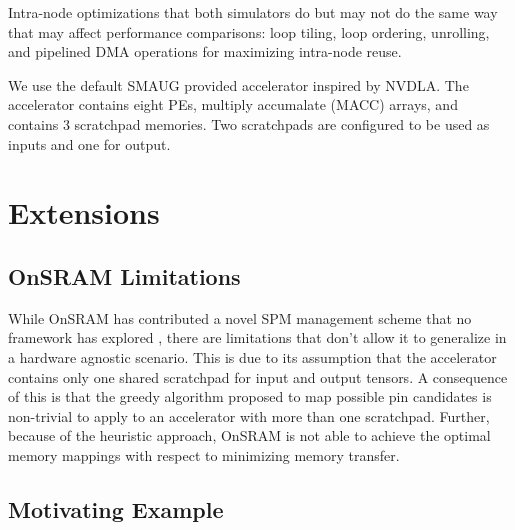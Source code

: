 Intra-node optimizations that both simulators do but may not do the same way
that may affect performance comparisons: loop tiling, loop ordering, unrolling,
and pipelined DMA operations for maximizing intra-node reuse.

We use the default SMAUG provided accelerator inspired by NVDLA\cite{smaug}.
The accelerator contains eight PEs, multiply accumalate (MACC) arrays, and
contains 3 scratchpad memories\cite{smaug}. Two scratchpads are configured to
be used as inputs and one for output.



\section{Extensions}


\subsection{OnSRAM Limitations}

While OnSRAM has contributed a novel SPM management scheme that no framework
has explored \cite{onsram}, there are limitations that don't allow it to
generalize in a hardware agnostic scenario. This is due to its assumption that
the accelerator contains only one shared scratchpad for input and output
tensors. A consequence of this is that the greedy algorithm proposed to map
possible pin candidates is non-trivial to apply to an accelerator with more
than one scratchpad. Further, because of the heuristic approach, OnSRAM is not
able to achieve the optimal memory mappings with respect to minimizing memory
transfer.


\subsection{Motivating Example}


